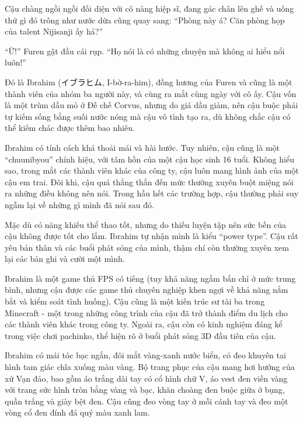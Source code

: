 \documentclass[../main.tex]{subfiles}
\begin{document}
\chrint


Cậu chàng ngồi ngồi đối diện với cô nàng hiệp sĩ, đang gác chân lên ghế và uống thứ gì đó trông như nước dừa cũng quay sang: ``Phòng này á? Căn phòng họp của talent Nijisanji ấy hả?''

``Ừ!'' Furen gật đầu cái rụp. ``Họ nói là có những chuyện mà không ai hiểu nổi luôn!''

\chrint

Đó là Ibrahim (イブラヒム, I-bờ-ra-him), đồng hương của Furen và cũng là một thành viên của nhóm ba người này, và cùng ra mắt cùng ngày với cô ấy. Cậu vốn là một trùm dầu mỏ ở Đế chế Corvus, nhưng do giá dầu giảm, nên cậu buộc phải tự kiếm sống bằng suối nước nóng mà cậu vô tình tạo ra, dù không chắc cậu có thể kiếm chác được thêm bao nhiêu.

Ibrahim có tính cách khá thoải mái và hài hước. Tuy nhiên, cậu cũng là một ``chuunibyou'' chính hiệu, với tâm hồn của một cậu học sinh 16 tuổi. Không hiểu sao, trong mắt các thành viên khác của công ty, cậu luôn mang hình ảnh của một cậu em trai. Đôi khi, cậu quá thẳng thắn đến mức thường xuyên buột miệng nói ra những điều không nên nói. Trong hầu hết các trường hợp, cậu thường phải suy ngẫm lại về những gì mình đã nói sau đó.

Mặc dù có năng khiếu thể thao tốt, nhưng do thiếu luyện tập nên sức bền của cậu không được tốt cho lắm. Ibrahim tự nhận mình là kiểu ``power type''. Cậu rất yêu bản thân và các buổi phát sóng của mình, thậm chí còn thường xuyên xem lại các bản ghi và cười một mình.

Ibrahim là một game thủ FPS có tiếng (tuy khả năng ngắm bắn chỉ ở mức trung bình, nhưng cậu được các game thủ chuyên nghiệp khen ngợi về khả năng nắm bắt và kiểm soát tình huống). Cậu cũng là một kiến trúc sư tài ba trong Minecraft - một trong những công trình của cậu đã trở thành điểm du lịch cho các thành viên khác trong công ty. Ngoài ra, cậu còn có kinh nghiệm đáng kể trong việc chơi pachinko, thể hiện rõ ở buổi phát sóng 3D đầu tiên của cậu.

Ibrahim có mái tóc bạc ngắn, đôi mắt vàng-xanh nước biển, có đeo khuyên tai hình tam giác chĩa xuống màu vàng. Bộ trang phục của cậu mang hơi hướng của xứ Vạn đảo, bao gồm áo trắng dài tay có cổ hình chữ V, áo vest đen viền vàng với trang sức hình tròn bằng vàng và bạc, khăn choàng đen buộc giữa ở bụng, quần trắng và giày bệt đen. Cậu cũng đeo vòng tay ở mỗi cánh tay và đeo một vòng cổ đen đính đá quý màu xanh lam.
\end{document}
